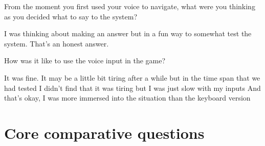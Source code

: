 \begin{QandA}


   \item From the moment you first used your voice to navigate, what were you thinking as you decided what to say to the system?

         \begin{answered}
            I was thinking about making an answer but in a fun way to somewhat test the system.
            That's an honest answer.
         \end{answered}

    \item How was it like to use the voice input in the game?
         \begin{answered}
            It was fine.
            It may be a little bit tiring after a while but in the time span that we had tested I didn't find that it was tiring but I was just slow with my inputs
            And that's okay, I was more immersed into the situation than the keyboard version
         \end{answered}


\end{QandA}




\section{Core comparative questions}

